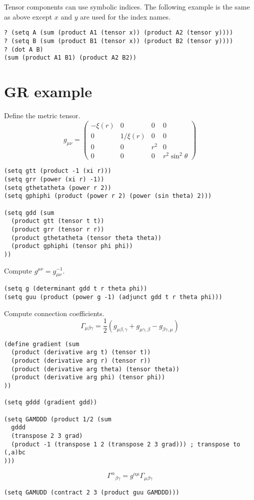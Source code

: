 \documentclass[12pt]{article}
\begin{document}
Tensor components can use symbolic indices.
The following example is the same as above except $x$ and $y$ are used for the index names.
\begin{verbatim}
? (setq A (sum (product A1 (tensor x)) (product A2 (tensor y))))
? (setq B (sum (product B1 (tensor x)) (product B2 (tensor y))))
? (dot A B)
(sum (product A1 B1) (product A2 B2))
\end{verbatim}

\section*{GR example}

Define the metric tensor.
\begin{equation*}
g_{\mu\nu}=\begin{pmatrix}
-\xi(r) & 0 & 0 & 0
\\
0 & 1/\xi(r) & 0 & 0
\\
0 & 0 & r^2 & 0
\\
0 & 0 & 0 & r^2\sin^2\theta
\end{pmatrix}
\end{equation*}
\begin{verbatim}
(setq gtt (product -1 (xi r)))
(setq grr (power (xi r) -1))
(setq gthetatheta (power r 2))
(setq gphiphi (product (power r 2) (power (sin theta) 2)))

(setq gdd (sum
  (product gtt (tensor t t))
  (product grr (tensor r r))
  (product gthetatheta (tensor theta theta))
  (product gphiphi (tensor phi phi))
))
\end{verbatim}

Compute $g^{\mu\nu}=g_{\mu\nu}^{-1}$.
\begin{verbatim}
(setq g (determinant gdd t r theta phi))
(setq guu (product (power g -1) (adjunct gdd t r theta phi)))
\end{verbatim}

Compute connection coefficients.
\begin{equation*}
\Gamma_{\mu\beta\gamma}=\frac{1}{2}
(g_{\mu\beta,\gamma}+g_{\mu\gamma,\beta}-g_{\beta\gamma,\mu})
\end{equation*}
%
\begin{verbatim}
(define gradient (sum
  (product (derivative arg t) (tensor t))
  (product (derivative arg r) (tensor r))
  (product (derivative arg theta) (tensor theta))
  (product (derivative arg phi) (tensor phi))
))

(setq gddd (gradient gdd))

(setq GAMDDD (product 1/2 (sum
  gddd
  (transpose 2 3 grad)
  (product -1 (transpose 1 2 (transpose 2 3 grad))) ; transpose to (,a)bc
)))
\end{verbatim}
%
\begin{equation*}
\Gamma^\alpha{}_{\beta\gamma}=g^{\alpha\mu}\Gamma_{\mu\beta\gamma}
\end{equation*}
%
\begin{verbatim}
(setq GAMUDD (contract 2 3 (product guu GAMDDD)))
\end{verbatim}
\end{document}
